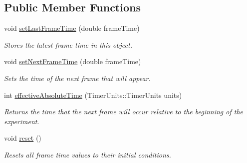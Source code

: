 \subsection*{Public Member Functions}
\begin{DoxyCompactItemize}
\item 
\hypertarget{struct_picto_1_1_controller_1_1_frame_tracker_a2e8649fbc2e3ba894a0d5823241a48f9}{void \hyperlink{struct_picto_1_1_controller_1_1_frame_tracker_a2e8649fbc2e3ba894a0d5823241a48f9}{set\-Last\-Frame\-Time} (double frame\-Time)}\label{struct_picto_1_1_controller_1_1_frame_tracker_a2e8649fbc2e3ba894a0d5823241a48f9}

\begin{DoxyCompactList}\small\item\em Stores the latest frame time in this object. \end{DoxyCompactList}\item 
void \hyperlink{struct_picto_1_1_controller_1_1_frame_tracker_acbf95c0460cbcb9a6c2d37a4fbcf7877}{set\-Next\-Frame\-Time} (double frame\-Time)
\begin{DoxyCompactList}\small\item\em Sets the time of the next frame that will appear. \end{DoxyCompactList}\item 
int \hyperlink{struct_picto_1_1_controller_1_1_frame_tracker_a55a588cd7360b14f1be88b4f9214c258}{effective\-Absolute\-Time} (Timer\-Units\-::\-Timer\-Units units)
\begin{DoxyCompactList}\small\item\em Returns the time that the next frame will occur relative to the beginning of the experiment. \end{DoxyCompactList}\item 
\hypertarget{struct_picto_1_1_controller_1_1_frame_tracker_ac75619800627a2081fe0aba7c7eece12}{void \hyperlink{struct_picto_1_1_controller_1_1_frame_tracker_ac75619800627a2081fe0aba7c7eece12}{reset} ()}\label{struct_picto_1_1_controller_1_1_frame_tracker_ac75619800627a2081fe0aba7c7eece12}

\begin{DoxyCompactList}\small\item\em Resets all frame time values to their initial conditions. \end{DoxyCompactList}\end{DoxyCompactItemize}
